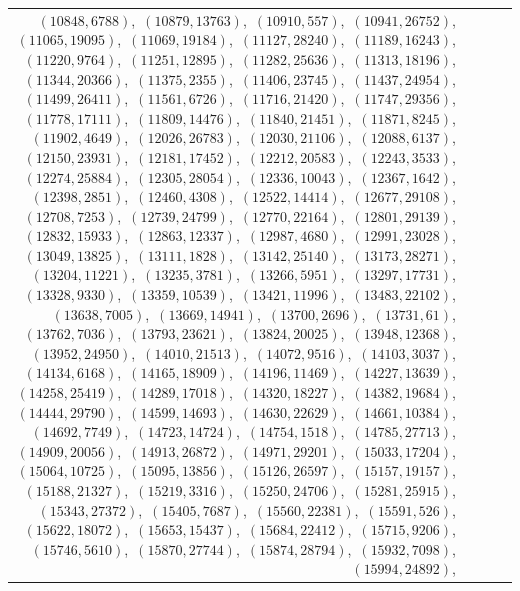 \documentclass[11pt]{article}
\begin{document}
\begin{longtable}{@{}rrl>{\raggedright\arraybackslash}p{}@{}}
$(10848,6788)$,\allowbreak\ $(10879,13763)$,\allowbreak\ $(10910,557)$,\allowbreak\ $(10941,26752)$,\allowbreak\ $(11065,19095)$,\allowbreak\ $(11069,19184)$,\allowbreak\ $(11127,28240)$,\allowbreak\ $(11189,16243)$,\allowbreak\ $(11220,9764)$,\allowbreak\ $(11251,12895)$,\allowbreak\ $(11282,25636)$,\allowbreak\ $(11313,18196)$,\allowbreak\ $(11344,20366)$,\allowbreak\ $(11375,2355)$,\allowbreak\ $(11406,23745)$,\allowbreak\ $(11437,24954)$,\allowbreak\ $(11499,26411)$,\allowbreak\ $(11561,6726)$,\allowbreak\ $(11716,21420)$,\allowbreak\ $(11747,29356)$,\allowbreak\ $(11778,17111)$,\allowbreak\ $(11809,14476)$,\allowbreak\ $(11840,21451)$,\allowbreak\ $(11871,8245)$,\allowbreak\ $(11902,4649)$,\allowbreak\ $(12026,26783)$,\allowbreak\ $(12030,21106)$,\allowbreak\ $(12088,6137)$,\allowbreak\ $(12150,23931)$,\allowbreak\ $(12181,17452)$,\allowbreak\ $(12212,20583)$,\allowbreak\ $(12243,3533)$,\allowbreak\ $(12274,25884)$,\allowbreak\ $(12305,28054)$,\allowbreak\ $(12336,10043)$,\allowbreak\ $(12367,1642)$,\allowbreak\ $(12398,2851)$,\allowbreak\ $(12460,4308)$,\allowbreak\ $(12522,14414)$,\allowbreak\ $(12677,29108)$,\allowbreak\ $(12708,7253)$,\allowbreak\ $(12739,24799)$,\allowbreak\ $(12770,22164)$,\allowbreak\ $(12801,29139)$,\allowbreak\ $(12832,15933)$,\allowbreak\ $(12863,12337)$,\allowbreak\ $(12987,4680)$,\allowbreak\ $(12991,23028)$,\allowbreak\ $(13049,13825)$,\allowbreak\ $(13111,1828)$,\allowbreak\ $(13142,25140)$,\allowbreak\ $(13173,28271)$,\allowbreak\ $(13204,11221)$,\allowbreak\ $(13235,3781)$,\allowbreak\ $(13266,5951)$,\allowbreak\ $(13297,17731)$,\allowbreak\ $(13328,9330)$,\allowbreak\ $(13359,10539)$,\allowbreak\ $(13421,11996)$,\allowbreak\ $(13483,22102)$,\allowbreak\ $(13638,7005)$,\allowbreak\ $(13669,14941)$,\allowbreak\ $(13700,2696)$,\allowbreak\ $(13731,61)$,\allowbreak\ $(13762,7036)$,\allowbreak\ $(13793,23621)$,\allowbreak\ $(13824,20025)$,\allowbreak\ $(13948,12368)$,\allowbreak\ $(13952,24950)$,\allowbreak\ $(14010,21513)$,\allowbreak\ $(14072,9516)$,\allowbreak\ $(14103,3037)$,\allowbreak\ $(14134,6168)$,\allowbreak\ $(14165,18909)$,\allowbreak\ $(14196,11469)$,\allowbreak\ $(14227,13639)$,\allowbreak\ $(14258,25419)$,\allowbreak\ $(14289,17018)$,\allowbreak\ $(14320,18227)$,\allowbreak\ $(14382,19684)$,\allowbreak\ $(14444,29790)$,\allowbreak\ $(14599,14693)$,\allowbreak\ $(14630,22629)$,\allowbreak\ $(14661,10384)$,\allowbreak\ $(14692,7749)$,\allowbreak\ $(14723,14724)$,\allowbreak\ $(14754,1518)$,\allowbreak\ $(14785,27713)$,\allowbreak\ $(14909,20056)$,\allowbreak\ $(14913,26872)$,\allowbreak\ $(14971,29201)$,\allowbreak\ $(15033,17204)$,\allowbreak\ $(15064,10725)$,\allowbreak\ $(15095,13856)$,\allowbreak\ $(15126,26597)$,\allowbreak\ $(15157,19157)$,\allowbreak\ $(15188,21327)$,\allowbreak\ $(15219,3316)$,\allowbreak\ $(15250,24706)$,\allowbreak\ $(15281,25915)$,\allowbreak\ $(15343,27372)$,\allowbreak\ $(15405,7687)$,\allowbreak\ $(15560,22381)$,\allowbreak\ $(15591,526)$,\allowbreak\ $(15622,18072)$,\allowbreak\ $(15653,15437)$,\allowbreak\ $(15684,22412)$,\allowbreak\ $(15715,9206)$,\allowbreak\ $(15746,5610)$,\allowbreak\ $(15870,27744)$,\allowbreak\ $(15874,28794)$,\allowbreak\ $(15932,7098)$,\allowbreak\ $(15994,24892)$,\allowbreak\ 
\end{longtable}
\end{document}
